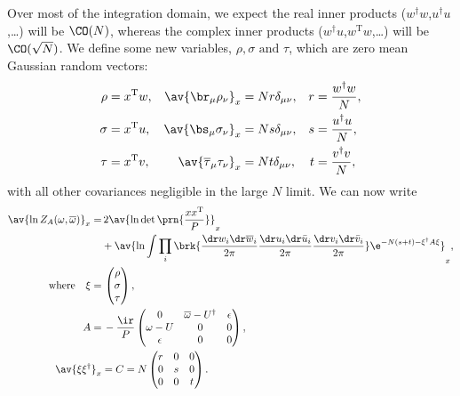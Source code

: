 \documentclass[12pt]{article}
\newcommand{\dg}{^\dagger}
\newcommand{\trans}{^\mathrm{T}}
\newcommand{\omb}{\overline{\omega}}
\newcommand{\bt}{\overline{\tau}}
\newcommand{\dw}{\dr w}
\newcommand{\dwb}{\dr\overline{w}}
\newcommand{\du}{\dr u}
\newcommand{\dub}{\dr\bar{u}}
\newcommand{\dv}{\dr v}
\newcommand{\dvb}{\dr\bar{v}}
\begin{document}
Over most of the integration domain, we expect the real inner products ($w\dg w$,$u\dg u$,\ldots) will be $\CO(N)$, whereas the complex inner products ($w\dg u$,$w\trans w$,\ldots) will be $\CO(\sqrt{N})$.
We define some new variables, $\rho,\sigma \text{ and } \tau$, which are zero mean Gaussian random vectors:
%
\begin{equation}\label{eq:rstdef}
\begin{aligned}
  \rho &= x\trans w ,
    & \av{\br_\mu \rho_\nu}_x &= Nr\delta_{\mu\nu} ,
    & r&=\frac{w\dg w}{N}, \\
  \sigma &= x\trans u ,
    & \av{\bs_\mu \sigma_\nu}_x &= Ns\delta_{\mu\nu} ,
    & s&=\frac{u\dg u}{N}, \\
  \tau &= x\trans v,
    & \av{\bt_\mu \tau_\nu}_x &= Nt\delta_{\mu\nu},
    & t&=\frac{v\dg v}{N}, \\
\end{aligned}
\end{equation}
%
with all other covariances negligible in the large $N$ limit.
We can now write
%
\begin{equation}\label{eq:potwuv}
\begin{aligned}
  \av{\ln Z_A(\omega,\omb)}_x =&\,  2\av{\ln\det\prn{\frac{xx\trans}{P}}}_x
  \\&
        +\av{\ln\int \prod_i\brk{ \frac{\dw_i\dwb_i}{2\pi} \frac{\du_i\dub_i}{2\pi} \frac{\dv_i\dvb_i}{2\pi} } \e^{-N(s+t)-\xi\dg A \xi} }_{x} ,
  \\ \text{where}\quad
  \xi =&\, \begin{pmatrix}
           \rho \\
           \sigma \\
           \tau \\
         \end{pmatrix},
 \\
  A =&\, -\frac{\ir}{P}
       \begin{pmatrix}
         0        & \omb-U\dg & \epsilon \\
         \omega-U & 0            & 0 \\
         \epsilon & 0            & 0 \\
       \end{pmatrix},\\
  \av{\xi\xi\dg}_x &=  C = N\begin{pmatrix}
         r & 0 & 0 \\
         0 & s & 0 \\
         0 & 0 & t \\
       \end{pmatrix}.
\end{aligned}
\end{equation}
\end{document}
